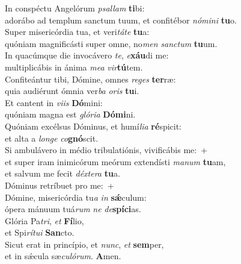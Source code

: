 \evenverse In conspéctu Angelórum \textit{psal}\textit{lam} \textbf{ti}bi:~\*\\
\evenverse adorábo ad templum sanctum tuum, et confitébor \textit{nó}\textit{mi}\textit{ni} \textbf{tu}o.\\
\oddverse Super misericórdia tua, et veri\textit{tá}\textit{te} \textbf{tu}a:~\*\\
\oddverse quóniam magnificásti super omne, no\textit{men} \textit{san}\textit{ctum} \textbf{tu}um.\\
\evenverse In quacúmque die invocávero \textit{te}, \textit{e}\textbf{xáu}di me:~\*\\
\evenverse multiplicábis in ánima \textit{me}\textit{a} \textit{vir}\textbf{tú}tem.\\
\oddverse Confiteántur tibi, Dómine, omnes \textit{re}\textit{ges} \textbf{ter}ræ:~\*\\
\oddverse quia audiérunt ómnia ver\textit{ba} \textit{o}\textit{ris} \textbf{tu}i.\\
\evenverse Et cantent in \textit{vi}\textit{is} \textbf{Dó}mini:~\*\\
\evenverse quóniam magna est \textit{gló}\textit{ri}\textit{a} \textbf{Dó}\textbf{mi}ni.\\
\oddverse Quóniam excélsus Dóminus, et humí\textit{li}\textit{a} \textbf{ré}spicit:~\*\\
\oddverse et alta a \textit{lon}\textit{ge} \textit{co}\textbf{gnó}scit.\\
\evenverse Si ambulávero in médio tribulatiónis, vivificábis me:~+\\
\evenverse  et super iram inimicórum meórum extendísti \textit{ma}\textit{num} \textbf{tu}am,~\*\\
\evenverse et salvum me fecit \textit{déx}\textit{te}\textit{ra} \textbf{tu}a.\\
\oddverse Dóminus retríbuet pro me:~+\\
\oddverse  Dómine, misericórdia tu\textit{a} \textit{in} \textbf{sǽ}culum:~\*\\
\oddverse ópera mánuum tuá\textit{rum} \textit{ne} \textit{de}\textbf{spí}\textbf{ci}as.\\
\evenverse Glória Pa\textit{tri}, \textit{et} \textbf{Fí}lio,~\*\\
\evenverse et Spi\textit{rí}\textit{tu}\textit{i} \textbf{San}cto.\\
\oddverse Sicut erat in princípio, et \textit{nunc}, \textit{et} \textbf{sem}per,~\*\\
\oddverse et in sǽcula sæ\textit{cu}\textit{ló}\textit{rum}. \textbf{A}men.\\
